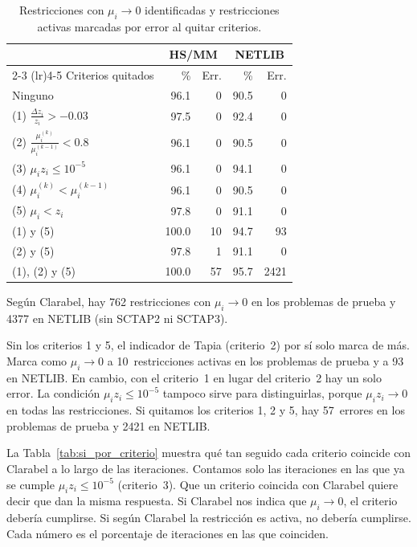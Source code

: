 \begin{table}[H]
\centering
\caption{Restricciones con $\mu_i \to 0$ identificadas y restricciones activas marcadas por error al quitar criterios.}
\label{tab:ablacion}
\small
\begin{tabular}{l r r r r}
\toprule
 & \multicolumn{2}{c}{HS/MM} & \multicolumn{2}{c}{NETLIB} \\
\cmidrule(lr){2-3} \cmidrule(lr){4-5}
Criterios quitados & \% & Err. & \% & Err. \\
\midrule
Ninguno & 96.1 & 0 & 90.5 & 0 \\[2pt]
(1) $\frac{\Delta z_i}{z_i} > -0.03$ & 97.5 & 0 & 92.4 & 0 \\[2pt]
(2) $\frac{\mu_i^{(k)}}{\mu_i^{(k-1)}} < 0.8$ & 96.1 & 0 & 90.5 & 0 \\[2pt]
(3) $\mu_i z_i \le 10^{-5}$ & 96.1 & 0 & 94.1 & 0 \\[2pt]
(4) $\mu_i^{(k)} < \mu_i^{(k-1)}$ & 96.1 & 0 & 90.5 & 0 \\[2pt]
(5) $\mu_i < z_i$ & 97.8 & 0 & 91.1 & 0 \\[2pt]
\midrule
(1) y (5) & 100.0 & 10 & 94.7 & 93 \\[2pt]
(2) y (5) & 97.8 & 1 & 91.1 & 0 \\[2pt]
(1), (2) y (5) & 100.0 & 57 & 95.7 & 2421 \\[2pt]
\bottomrule
\end{tabular}

\vspace{0.3em}
\footnotesize
Según Clarabel, hay 762 restricciones con $\mu_i \to 0$ en los problemas de prueba y 4377 en NETLIB (sin SCTAP2 ni SCTAP3).
\end{table}

Sin los criterios 1 y 5, el indicador de Tapia (criterio~2) por sí solo marca de más. Marca como $\mu_i \to 0$ a 10~restricciones activas en los problemas de prueba y a 93 en NETLIB. En cambio, con el criterio~1 en lugar del criterio~2 hay un solo error. La condición $\mu_i z_i \le 10^{-5}$ tampoco sirve para distinguirlas, porque $\mu_i z_i \to 0$ en todas las restricciones. Si quitamos los criterios 1, 2 y 5, hay 57~errores en los problemas de prueba y 2421 en NETLIB.

La Tabla~\ref{tab:si_por_criterio} muestra qué tan seguido cada criterio coincide con Clarabel a lo largo de las iteraciones. Contamos solo las iteraciones en las que ya se cumple $\mu_i z_i \le 10^{-5}$ (criterio~3). Que un criterio coincida con Clarabel quiere decir que dan la misma respuesta. Si Clarabel nos indica que $\mu_i \to 0$, el criterio debería cumplirse. Si según Clarabel la restricción es activa, no debería cumplirse. Cada número es el porcentaje de iteraciones en las que coinciden.

